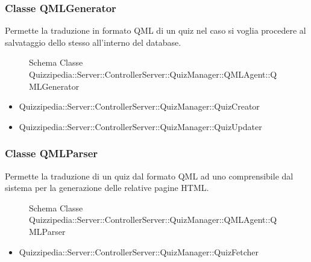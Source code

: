 \subsubsection{Classe QMLGenerator}
Permette la traduzione in formato QML di un quiz nel caso si voglia procedere al salvataggio dello stesso all'interno del database.
\begin{figure}[H]
\centering
\noindent{}
\caption{Schema Classe Quizzipedia::Server::ControllerServer::QuizManager::QMLAgent::QMLGenerator}
\end{figure}
\begin{itemize}
\item Quizzipedia::Server::ControllerServer::QuizManager::QuizCreator
\item Quizzipedia::Server::ControllerServer::QuizManager::QuizUpdater
\end{itemize}
\subsubsection{Classe QMLParser}
Permette la traduzione di un quiz dal formato QML ad uno comprensibile dal sistema per la generazione delle relative pagine HTML.
\begin{figure}[H]
\centering
\noindent{}
\caption{Schema Classe Quizzipedia::Server::ControllerServer::QuizManager::QMLAgent::QMLParser}
\end{figure}
\begin{itemize}
\item Quizzipedia::Server::ControllerServer::QuizManager::QuizFetcher
\end{itemize}
